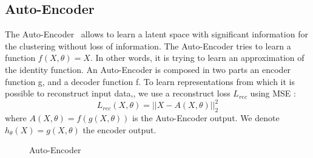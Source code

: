 \subsection{Auto-Encoder}
The Auto-Encoder~\cite{Goodfellow-et-al-2016} allows to learn a latent space with significant
information for the clustering without loss of information.
The Auto-Encoder tries to learn a function $f (X, \theta) = X$. In
other words, it is trying to learn an approximation of the identity
function. An Auto-Encoder is composed in two parts an encoder function
g, and a decoder function f. To learn representations from which it is 
possible to reconstruct input data,, we use a
reconstruct loss $L_{rec}$ using MSE :
\begin{equation}
  L_{rec}(X, \theta) = || X - A(X, \theta) ||_2^2 
\end{equation}
where $A(X, \theta) = f(g(X, \theta))$ is the Auto-Encoder output. We denote 
$h_\theta(X) = g(X,\theta)$ the encoder output.
\begin{figure}[!h]
  \centering
  \caption{Auto-Encoder}
  \label{fig:autoenc}
\end{figure} 
